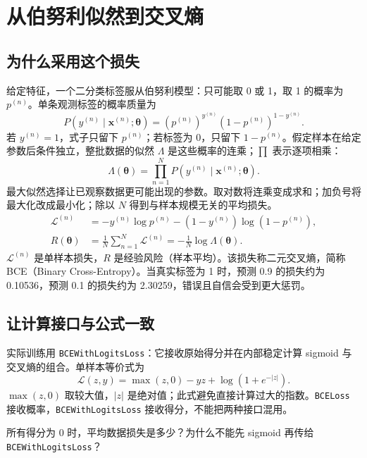 \documentclass[UTF8,a4paper,11pt,fontset=fandol]{ctexart}
\begin{document}
\section{从伯努利似然到交叉熵}
\subsection{为什么采用这个损失}
给定特征，一个二分类标签服从伯努利模型：只可能取 0 或 1，取 1 的概率为 $p^{(n)}$。单条观测标签的概率质量为
\begin{equation}
P(y^{(n)}\mid\mathbf x^{(n)};\boldsymbol\theta)
=(p^{(n)})^{y^{(n)}}(1-p^{(n)})^{1-y^{(n)}}.
\end{equation}
若 $y^{(n)}=1$，式子只留下 $p^{(n)}$；若标签为 0，只留下 $1-p^{(n)}$。假定样本在给定参数后条件独立，整批数据的似然 $\Lambda$ 是这些概率的连乘；$\prod$ 表示逐项相乘：
\begin{equation}
\Lambda(\boldsymbol\theta)=\prod_{n=1}^N P(y^{(n)}\mid\mathbf x^{(n)};\boldsymbol\theta).
\end{equation}
最大似然选择让已观察数据更可能出现的参数。取对数将连乘变成求和；加负号将最大化改成最小化；除以 $N$ 得到与样本规模无关的平均损失。
\begin{equation}
\begin{aligned}
\mathcal L^{(n)}&=-y^{(n)}\log p^{(n)}-(1-y^{(n)})\log(1-p^{(n)}),\\
R(\boldsymbol\theta)&=\frac1N\sum_{n=1}^N\mathcal L^{(n)}=-\frac1N\log\Lambda(\boldsymbol\theta).
\end{aligned}
\end{equation}
$\mathcal L^{(n)}$ 是单样本损失，$R$ 是经验风险（样本平均）。该损失称二元交叉熵，简称 BCE（Binary Cross-Entropy）。当真实标签为 1 时，预测 0.9 的损失约为 0.10536，预测 0.1 的损失约为 2.30259，错误且自信会受到更大惩罚。
\subsection{让计算接口与公式一致}
实际训练用 \texttt{BCEWithLogitsLoss}：它接收原始得分并在内部稳定计算 sigmoid 与交叉熵的组合。单样本等价式为
\begin{equation}
\mathcal L(z,y)=\max(z,0)-yz+\log(1+e^{-|z|}).
\end{equation}
$\max(z,0)$ 取较大值，$|z|$ 是绝对值；此式避免直接计算过大的指数。\texttt{BCELoss} 接收概率，\texttt{BCEWith\allowbreak{}LogitsLoss} 接收得分，不能把两种接口混用。
\begin{questionbox}[检查点 C5]
所有得分为 0 时，平均数据损失是多少？为什么不能先 sigmoid 再传给 \texttt{BCEWithLogitsLoss}？
\end{questionbox}
\clearpage
\end{document}
